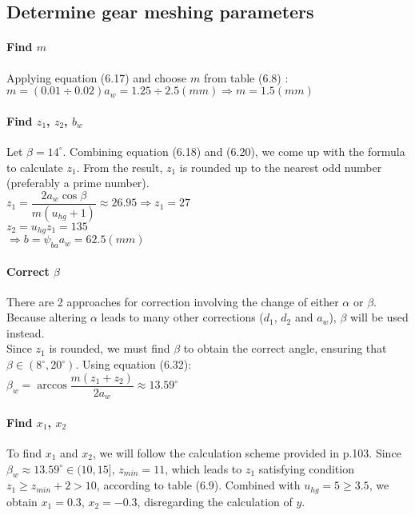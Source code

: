 \subsection{Determine gear meshing parameters}

\paragraph{Find $ m $} Applying equation (6.17)  and choose $ m $ from table (6.8) :\\
$ m = (0.01\div0.02)a_w = 1.25\div2.5 \unit{(mm)} \Rightarrow m=1.5\unit{(mm)}$

\paragraph{Find $ z_1 $, $ z_2 $, $ b_w $} Let $ \beta = 14^\circ $. Combining equation (6.18) and (6.20), we come up with the formula to calculate $ z_1 $. From the result, $ z_1 $ is rounded up to the nearest odd number (preferably a prime number).\\
$ z_1 = \dfrac{2a_w\cos\beta}{m(u_{hg}+1)} \approx 26.95 \Rightarrow z_1 = 27$\\
$ z_2 = u_{hg}z_1 = 135 $\\
$ \Rightarrow b = \psi_{ba}a_w = 62.5\unit{(mm)}$ 

\paragraph{Correct $ \beta $} There are 2 approaches for correction involving the change of either $ \alpha $ or $ \beta $. Because altering $ \alpha $ leads to many other corrections ($ d_1 $, $ d_2 $ and $ a_w $), $ \beta $ will be used instead.\\
Since $ z_1 $ is rounded, we must find $ \beta $ to obtain the correct angle, ensuring that $ \beta \in (8^\circ, 20^\circ) $. Using equation (6.32):\\
$ \beta_w = \arccos\dfrac{m(z_1+z_2)}{2a_w} \approx 13.59^\circ$

\paragraph{Find $ x_1 $, $ x_2 $} To find $ x_1 $ and $ x_2 $, we will follow the calculation scheme provided in p.103. Since $ \beta_w \approx 13.59^\circ \in (10,15]$, $ z_{min} = 11$, which leads to $ z_1 $ satisfying condition $ z_1 \geq z_{min} + 2 > 10 $, according to table (6.9). Combined with $ u_{hg} = 5 \geq 3.5 $, we obtain $ x_1 = 0.3 $, $ x_2 = -0.3 $, disregarding the calculation of $ y $.

